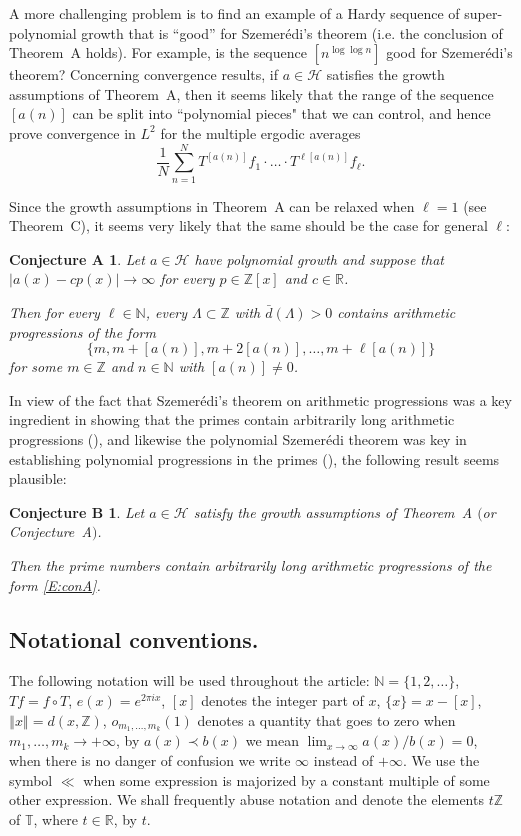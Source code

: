 \documentclass[11pt]{amsart}
\renewcommand{\H}{\mathcal{H}}
\newcommand{\T}{\mathbb{T}}
\newcommand{\R}{\mathbb{R}}
\newcommand{\N}{\mathbb{N}}
\newcommand{\Z}{\mathbb{Z}}
\newcommand{\norm}[1]{\left\Vert #1\right\Vert}
\theoremstyle{plain}
\newtheorem*{conjectureA}{Conjecture A}
\newtheorem*{conjectureB}{Conjecture B}
\theoremstyle{definition}
\theoremstyle{remark}
\begin{document}
 A more challenging problem is to find an example of a Hardy sequence of super-polynomial growth that is ``good'' for  Szemer\'edi's theorem (i.e. the conclusion of Theorem~A holds). For example, is  the sequence $[n^{\log\log{n}}]$
good for  Szemer\'edi's theorem?
  Concerning convergence results,  if $a\in\H$ satisfies the growth assumptions of Theorem~A, then it seems likely that the range of the sequence $[a(n)]$ can be split into ``polynomial pieces" that we can control, and hence  prove convergence in $L^2$ for the multiple ergodic averages
$$
\frac{1}{N}\sum_{n=1}^N T^{[a(n)]}f_1\cdot \ldots \cdot T^{\ell[a(n)]}f_\ell.
$$


Since the growth assumptions in Theorem~A can be relaxed when $\ell=1$ (see Theorem~C), it seems very likely that the same should be the case for general $\ell$:
\begin{conjectureA}\label{Con:A}
  Let $a\in \H$ have  polynomial growth and suppose that $|a(x)-cp(x)|\to\infty $ for every $p\in\Z[x]$ and $c\in\R$.

  Then for every $\ell\in\N$, every $\Lambda\subset\mathbb{Z}$ with
  $\bar{d}(\Lambda)>0$ contains arithmetic progressions of the form
  \begin{equation}\label{E:conA}
    \{m, m+[a(n)],m+2[a(n)],\ldots, m+\ell[a(n)]\}
  \end{equation}
  for some $m\in \Z $ and $n\in\N$ with $[a(n)]\neq 0$.
\end{conjectureA}
In view of the fact that Szemer\'edi's theorem on arithmetic progressions was a key ingredient in  showing that the primes contain arbitrarily long arithmetic progressions (\cite{GT1}), and likewise the polynomial Szemer\'edi theorem  was key in
  establishing polynomial progressions in the primes (\cite{TZ}), the following result seems plausible:
\begin{conjectureB}\label{Con:B}
Let $a\in \H$ satisfy the growth assumptions of Theorem~A $($or Conjecture~A$)$.

Then the  prime numbers contain arbitrarily long arithmetic progressions of the form \eqref{E:conA}.
\end{conjectureB}


\subsection{Notational conventions.} The following notation will be
used throughout the article: $\N=\{1,2,\ldots\}$, $Tf=f\circ T$,
$e(x)=e^{2\pi i x}$, $[x]$ denotes the integer part of $x$,  $\{x\}=x-[x]$, $\norm{x}=d(x,\Z)$,
$o_{m_1,\ldots,m_k}(1)$ denotes a quantity that goes to zero when
$m_1,\ldots,m_k\to +\infty$, by $a(x)\prec b(x)$ we mean
$\lim_{x\to\infty}a(x)/b(x)=0$, when there is no danger of confusion
we write $\infty$ instead of $+\infty$. We use the symbol $\ll$  when
 some expression is  majorized by a constant multiple of some  other expression.
We shall frequently abuse notation and denote the elements $t\Z$ of $\T$, where $t\in \R$,  by $t$.
\end{document}
